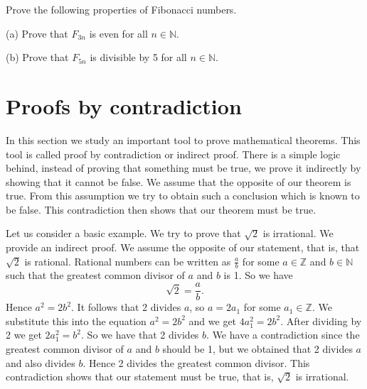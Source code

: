 \begin{exercise}\label{induction-10}
Prove the following properties of Fibonacci numbers.

(a) Prove that $F_{3n}$ is even for all $n\in\mathbb{N}$.  

(b) Prove that $F_{5n}$ is divisible by 5 for all $n\in\mathbb{N}$. 

\end{exercise}



\section{Proofs by contradiction}
In this section we study an important tool to prove mathematical theorems. This tool is called proof by contradiction or
indirect proof. There is a simple logic behind, instead of proving that something must be true, we prove it indirectly by showing 
that it cannot be false. We assume that the opposite of our theorem is true. From this assumption we try to obtain such a conclusion 
which is known to be false. This contradiction then shows that our theorem must be true.

Let us consider a basic example. We try to prove that $\sqrt{2}$ is irrational. We provide an indirect proof. We assume the opposite
of our statement, that is, that $\sqrt{2}$ is rational. Rational numbers can be written as $\frac{a}{b}$ for some $a\in\mathbb{Z}$
and $b\in\mathbb{N}$ such that the greatest common divisor of $a$ and $b$ is 1. So we have 
$$
\sqrt{2}=\frac{a}{b}.
$$
Hence $a^2=2b^2$. It follows that 2 divides $a$, so $a=2a_1$ for some $a_1\in\mathbb{Z}$. We substitute this into the equation
$a^2=2b^2$ and we get $4a_1^2=2b^2$. After dividing by 2 we get $2a_1^2=b^2$. So we have that 2 divides $b$. We have a contradiction
since the greatest common divisor of $a$ and $b$ should be 1, but we obtained that 2 divides $a$ and also divides $b$. Hence 2 divides 
the greatest common divisor. This contradiction shows that our statement must be true, that is, $\sqrt{2}$ is irrational.

